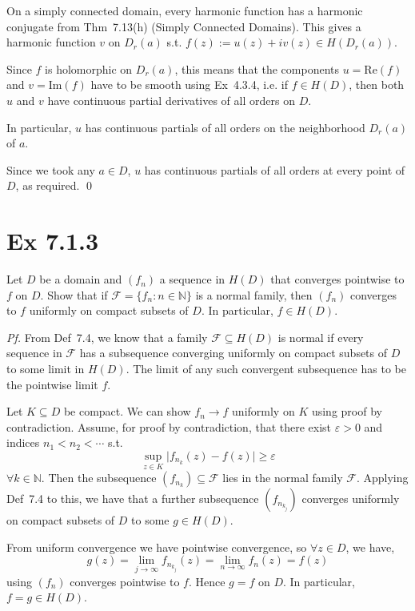 \documentclass[a4paper]{article}
\begin{document}
On a simply connected domain, every harmonic function has a harmonic conjugate from Thm~7.13(h) (Simply Connected Domains). This gives a harmonic function $v$ on $D_{r}(a)$ s.t. $f(z):=u(z)+i v(z)\in H(D_{r}(a))$.

\medskip
Since $f$ is holomorphic on $D_{r}(a)$, this means that the components $u=\mathrm{Re}(f)$ and $v=\mathrm{Im}(f)$ have to be smooth using Ex~4.3.4, i.e. if $f\in H(D)$, then both $u$ and $v$ have continuous partial derivatives of all orders on $D$. 

In particular, $u$ has continuous partials of all orders on the neighborhood $D_{r}(a)$ of $a$.

\medskip
Since we took any $a\in D$, $u$ has continuous partials of all orders at every point of $D$, as required. \qed

\newpage

\section*{Ex 7.1.3}

\begin{tcolorbox}[colback=gray!10, colframe=black, boxrule=0.5pt, arc=2mm]
Let $D$ be a domain and $(f_{n})$ a sequence in $H(D)$ that converges pointwise to $f$ on $D$. Show that if $\mathcal{F}=\{f_{n}:n\in\mathbb{N}\}$ is a normal family, then $(f_{n})$ converges to $f$ uniformly on compact subsets of $D$. In particular, $f\in H(D)$.
\end{tcolorbox}

\textit{Pf.} From Def~7.4, we know that a family $\mathcal{F}\subseteq H(D)$ is normal if every sequence in $\mathcal{F}$ has a subsequence converging uniformly on compact subsets of $D$ to some limit in $H(D)$. The limit of any such convergent subsequence has to be the pointwise limit $f$.

\medskip
Let $K\subseteq D$ be compact. We can show $f_n\to f$ uniformly on $K$ using proof by contradiction. Assume, for proof by contradiction, that there exist $\varepsilon>0$ and indices $n_{1}<n_{2}<\cdots$ s.t.
\[
  \sup_{z\in K}\bigl|f_{n_{k}}(z)-f(z)\bigr|\ge \varepsilon \tag{$\ast$}
\]
$\forall k\in\mathbb{N}$. Then the subsequence $(f_{n_{k}})\subseteq\mathcal{F}$ lies in the normal family $\mathcal{F}$. Applying Def~7.4 to this, we have that a further subsequence $(f_{n_{k_{j}}})$ converges uniformly on compact subsets of $D$ to some $g\in H(D)$.

\medskip
From uniform convergence we have pointwise convergence, so $\forall z\in D$, we have,
\[
  g(z)=\lim_{j\to\infty}f_{n_{k_{j}}}(z)=\lim_{n\to\infty}f_{n}(z)=f(z)
\]
using $(f_{n})$ converges pointwise to $f$. Hence $g=f$ on $D$. In particular, $f=g\in H(D)$.
\end{document}
